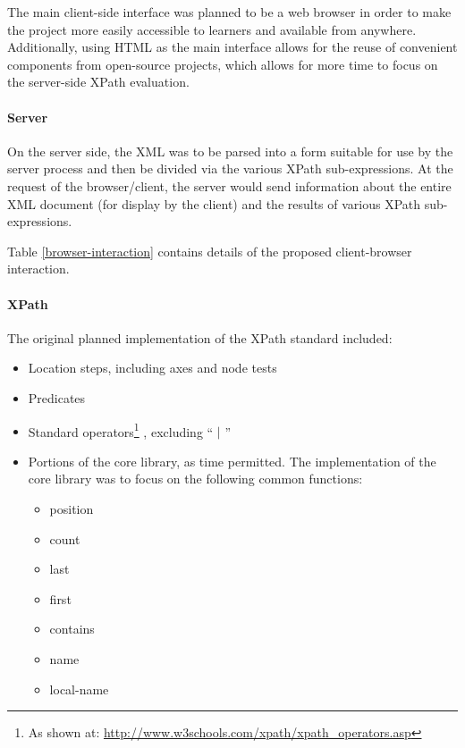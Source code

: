 \documentclass{acm_proc_article-sp}
\begin{document}
The main client-side interface was planned to be a web browser in order to make the project more easily accessible to learners and available from anywhere.  Additionally, using HTML as the main interface allows for the reuse of convenient components from open-source projects\cite{org02,xml1,xml2,xml3}, which allows for more time to focus on the server-side XPath evaluation.

\paragraph{Server}
On  the server side, the XML was to be parsed into a form suitable for use by the server process and then be divided via the various XPath sub-expressions.  At the request of the browser/client, the server would send information about the entire XML document (for display by the client) and the results of various XPath sub-expressions. 

Table \ref{browser-interaction} contains details of the proposed client-browser interaction.  

\paragraph{XPath}
The original planned implementation of the XPath standard included:
\begin{itemize}
\item Location steps, including axes and node tests
\item Predicates
\item Standard operators\protect\footnote{As shown at: \url{http://www.w3schools.com/xpath/xpath_operators.asp}} , excluding `` $|$ ''
\item Portions of the core library, as time permitted.  The implementation of the core library was to focus on the following common functions:
	\begin{itemize}
	\item position
	\item count
	\item last
	\item first
	\item contains
	\item name
	\item local-name
	\end{itemize}
\end{itemize}
\end{document}
